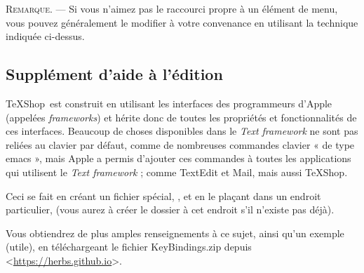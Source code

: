 \documentclass[11pt,french]{article}
\newcommand{\TS}{\textsf{\TeX Shop}}
\newcommand{\cmd}[1]{\textsf{#1}}
\newcommand{\mnu}[1]{\textsf{#1}}
\newcommand{\To}{\,\(\to\)\,}
\begin{document}


\textsc{Remarque}. --- Si vous n'aimez pas le raccourci propre à un élément de menu, vous pouvez généralement le modifier à votre convenance en utilisant la technique indiquée ci-dessus.

\subsection{Supplément d'aide à l'édition} 

\TS\ est construit en utilisant les interfaces des programmeurs d'Apple (appelées \emph{frameworks}) et hérite donc de toutes les propriétés et fonctionnalités de ces interfaces. Beaucoup de choses disponibles dans le \emph{Text framework} ne sont pas reliées au clavier par défaut, comme de nombreuses commandes clavier « de type \cmd{emacs} », mais Apple a permis d'ajouter ces commandes à toutes les applications qui utilisent le \emph{Text framework} ; comme \textsf{TextEdit} et \textsf{Mail}, mais aussi \TS.

Ceci se fait en créant un fichier spécial, , et en le plaçant dans un endroit particulier,  (vous aurez à créer le dossier  à cet endroit s'il n'existe pas déjà).

Vous obtiendrez de plus amples renseignements à ce sujet, ainsi qu'un exemple (utile), en téléchargeant le fichier \textsf{KeyBindings.zip} depuis <\url{https://herbs.github.io}>.
\end{document}
